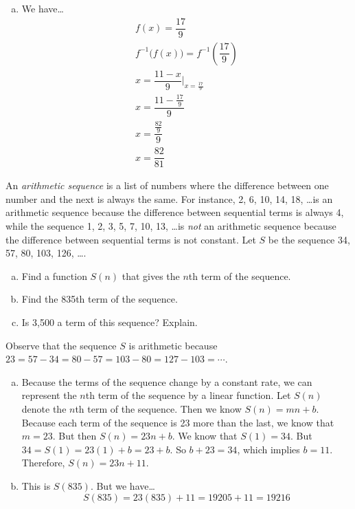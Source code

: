 \documentclass[12pt,letterpaper]{exam}
\begin{document}
\begin{questions}
\begin{enumerate}[(a)]
\item We have\dots
	\[
	\begin{gathered}
	f(x)= \dfrac{17}{9} \\[0.2cm]
	f^{-1} \big( f(x) \big)= f^{-1} \left( \dfrac{17}{9} \right) \\[0.2cm]
	x= \dfrac{11 - x}{9} \bigg|_{x= \frac{17}{9}} \\[0.2cm]
	x= \dfrac{11 - \frac{17}{9}}{9} \\[0.2cm]
	x= \dfrac{\frac{82}{9}}{9} \\[0.2cm]
	x= \dfrac{82}{81}
	\end{gathered}
	\]
\end{enumerate}



\newpage
\question[10] An \textit{arithmetic sequence} is a list of numbers where the difference between one number and the next is always the same. For instance, 2, 6, 10, 14, 18, \dots is an arithmetic sequence because the difference between sequential terms is always 4, while the sequence 1, 2, 3, 5, 7, 10, 13, \dots is \textit{not} an arithmetic sequence because the difference between sequential terms is not constant. Let $S$ be the sequence 34, 57, 80, 103, 126, \dots. 
	\begin{enumerate}[(a)]
	\item Find a function $S(n)$ that gives the $n$th term of the sequence. 
	\item Find the 835th term of the sequence. 
	\item Is 3,500 a term of this sequence? Explain. 
	\end{enumerate} \pspace

\sol Observe that the sequence $S$ is arithmetic because $23= 57 - 34= 80 - 57= 103 - 80= 127 - 103= \cdots$. 

\begin{enumerate}[(a)]
\item Because the terms of the sequence change by a constant rate, we can represent the $n$th term of the sequence by a linear function. Let $S(n)$ denote the $n$th term of the sequence. Then we know $S(n)= mn + b$. Because each term of the sequence is 23 more than the last, we know that $m= 23$. But then $S(n)= 23n + b$. We know that $S(1)= 34$. But $34= S(1)= 23(1) + b= 23 + b$. So $b + 23= 34$, which implies $b= 11$. Therefore, $S(n)= 23n + 11$. \pspace

\item This is $S(835)$. But we have\dots
	\[
	S(835)= 23(835) + 11= 19205 + 11= 19216
	\] \pspace


\end{enumerate}
\end{questions}
\end{document}
